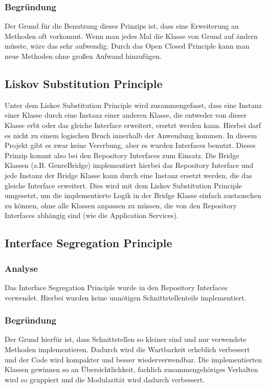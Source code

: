         \subsubsection{Begründung}
        Der Grund für die Benutzung dieses Prinzips ist, dass eine Erweiterung an Methoden oft vorkommt. Wenn man jedes Mal die Klasse von Grund auf ändern müsste, wäre das sehr aufwendig. Durch das Open Closed Principle kann man neue Methoden ohne großen Aufwand hinzufügen.

    \subsection{Liskov Substitution Principle}
        Unter dem Liskov Substitution Principle wird zusammengefasst, dass eine Instanz einer Klasse durch eine Instanz einer anderen Klasse, die entweder von dieser Klasse erbt oder das gleiche Interface erweitert, ersetzt werden kann. Hierbei darf es nicht zu einem logischen Bruch innerhalb der Anwendung kommen. In diesem Projekt gibt es zwar keine Vererbung, aber es wurden Interfaces benutzt. Dieses Prinzip kommt also bei den Repository Interfaces zum Einsatz. Die Bridge Klassen (z.B. GenreBridge) implementiert hierbei das Repository Interface und jede Instanz der Bridge Klasse kann durch eine Instanz ersetzt werden, die das gleiche Interface erweitert. Dies wird mit dem Liskov Substitution Principle umgesetzt, um die implementierte Logik in der Bridge Klasse einfach austauschen zu können, ohne alle Klassen anpassen zu müssen, die von den Repository Interfaces abhängig sind (wie die Application Services).

    \subsection{Interface Segregation Principle}
    
        \subsubsection{Analyse}
        Das Interface Segregation Principle wurde in den Repository Interfaces verwendet. Hierbei wurden keine unnötigen Schnittstellenteile implementiert.
        
        \subsubsection{Begründung}
        Der Grund hierfür ist, dass Schnittstellen so kleiner sind und nur verwendete Methoden implementieren. Dadurch wird die Wartbarkeit erheblich verbessert und der Code wird kompakter und besser wiederverwendbar. Die implementierten Klassen gewinnen so an Übersichtlichkeit, fachlich zusammengehöriges Verhalten wird so gruppiert und die Modularität wird dadurch verbessert.

